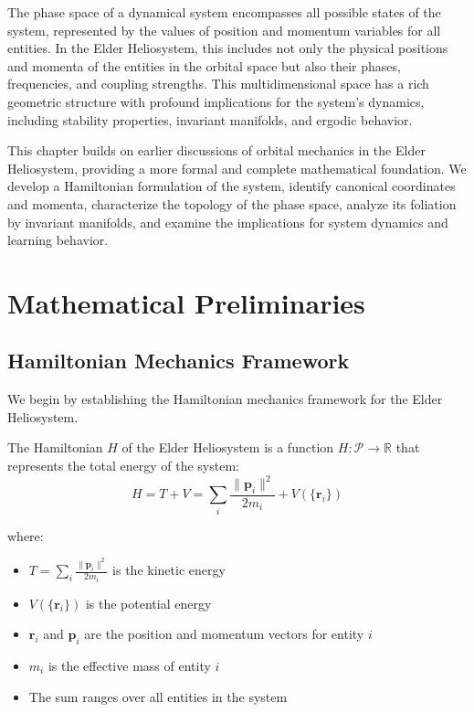 The phase space of a dynamical system encompasses all possible states of the system, represented by the values of position and momentum variables for all entities. In the Elder Heliosystem, this includes not only the physical positions and momenta of the entities in the orbital space but also their phases, frequencies, and coupling strengths. This multidimensional space has a rich geometric structure with profound implications for the system's dynamics, including stability properties, invariant manifolds, and ergodic behavior.

This chapter builds on earlier discussions of orbital mechanics in the Elder Heliosystem, providing a more formal and complete mathematical foundation. We develop a Hamiltonian formulation of the system, identify canonical coordinates and momenta, characterize the topology of the phase space, analyze its foliation by invariant manifolds, and examine the implications for system dynamics and learning behavior.

\section{Mathematical Preliminaries}

\subsection{Hamiltonian Mechanics Framework}

We begin by establishing the Hamiltonian mechanics framework for the Elder Heliosystem.

\begin{definition}
The Hamiltonian $H$ of the Elder Heliosystem is a function $H: \mathcal{P} \to \mathbb{R}$ that represents the total energy of the system:
\begin{equation}
H = T + V = \sum_{i} \frac{\|\mathbf{p}_i\|^2}{2m_i} + V(\{\mathbf{r}_i\})
\end{equation}

where:
\begin{itemize}
    \item $T = \sum_{i} \frac{\|\mathbf{p}_i\|^2}{2m_i}$ is the kinetic energy
    \item $V(\{\mathbf{r}_i\})$ is the potential energy
    \item $\mathbf{r}_i$ and $\mathbf{p}_i$ are the position and momentum vectors for entity $i$
    \item $m_i$ is the effective mass of entity $i$
    \item The sum ranges over all entities in the system
\end{itemize}
\end{definition}

